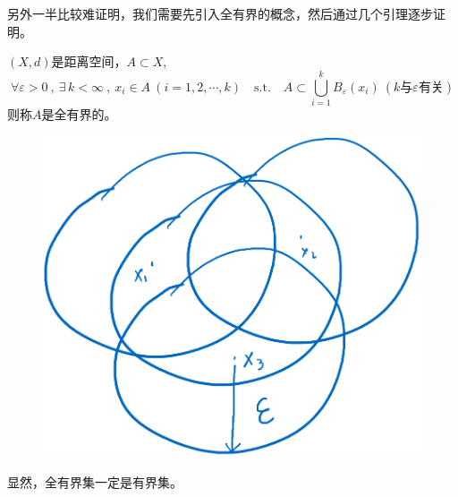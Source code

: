 另外一半比较难证明，我们需要先引入全有界的概念，然后通过几个引理逐步证明。
\begin{definition}[全有界性]
    $(X,d)$是距离空间，$A \subset X$,
    \[\forall \varepsilon>0 \ , \ \exists \, k<\infty \ , \ x_i \in A \ (i=1,2,\cdots,k) \quad \text{s.t.} \quad A \subset \bigcup_{i=1}^kB_{\varepsilon}(x_i) \ (k\text{与$\varepsilon$有关})\]
    则称$A$是全有界的。
\end{definition}
\begin{figure}[htbp]
    \center
    \includegraphics[scale=0.25]{./fig/2.2.3.png}
\end{figure}
显然，全有界集一定是有界集。
